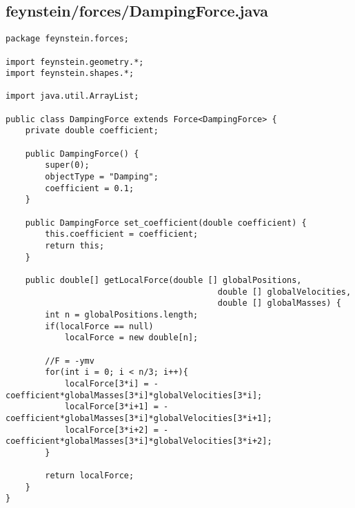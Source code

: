 \subsection*{feynstein/forces/DampingForce.java}
\begin{lstlisting}
package feynstein.forces;

import feynstein.geometry.*;
import feynstein.shapes.*;

import java.util.ArrayList;

public class DampingForce extends Force<DampingForce> {
	private double coefficient;

    public DampingForce() {
		super(0);
		objectType = "Damping";
		coefficient = 0.1;
    }
 
    public DampingForce set_coefficient(double coefficient) {
		this.coefficient = coefficient;
		return this;
    }

	public double[] getLocalForce(double [] globalPositions,
										   double [] globalVelocities,
										   double [] globalMasses) {
		int n = globalPositions.length;
		if(localForce == null)
			localForce = new double[n];
		
		//F = -ymv
		for(int i = 0; i < n/3; i++){
			localForce[3*i] = -coefficient*globalMasses[3*i]*globalVelocities[3*i];
			localForce[3*i+1] = -coefficient*globalMasses[3*i]*globalVelocities[3*i+1];
			localForce[3*i+2] = -coefficient*globalMasses[3*i]*globalVelocities[3*i+2];
		}
		
		return localForce;
	}
}
\end{lstlisting}

